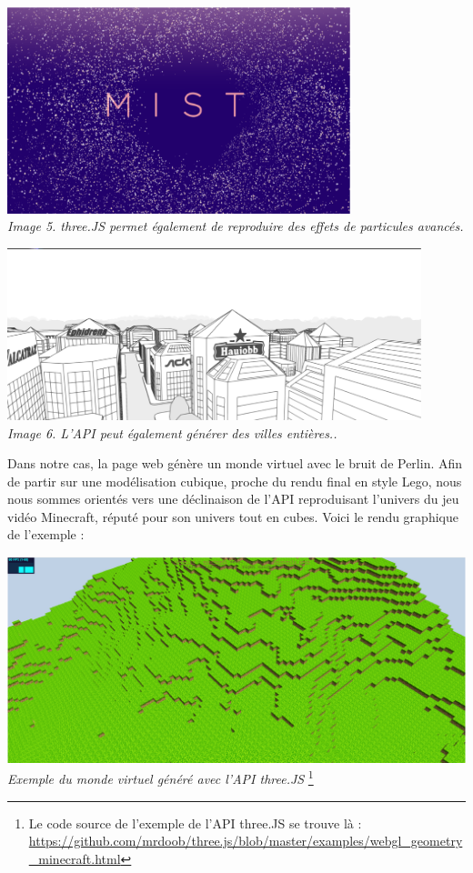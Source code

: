 \begin{center}
	\includegraphics[height=6cm]{images/threeJS-poly-particle.eps}\\
	\textit{Image 5. three.JS permet également de reproduire des effets de particules avancés.}
\end{center}

\begin{center}
	\includegraphics[height=5cm]{images/threeJS-poly-city.eps}\\
	\textit{Image 6. L'API peut également générer des villes entières..}
\end{center}



Dans notre cas, la page web génère un monde virtuel avec le bruit de Perlin. Afin de partir sur une modélisation cubique, proche du rendu final en style Lego, nous nous sommes orientés vers une déclinaison de l'API reproduisant l'univers du jeu vidéo Minecraft, réputé pour son univers tout en cubes. Voici le rendu graphique de l'exemple :

\begin{center}
	\includegraphics[height=6cm]{images/threeJS-minecraft.eps}\\
	\textit{Exemple du monde virtuel généré avec l'API three.JS}
	\footnote{Le code source de l'exemple de l'API three.JS se trouve là : \url{https://github.com/mrdoob/three.js/blob/master/examples/webgl_geometry_minecraft.html}}
\end{center}

